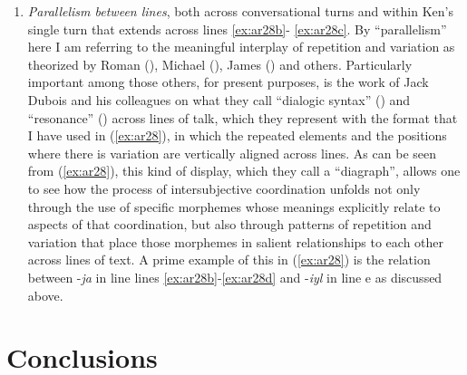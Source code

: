 \documentclass[output=paper]{langsci/langscibook}
\begin{document}
\begin{enumerate}
	\item \emph{Parallelism between lines}, both across conversational turns and within Ken’s single turn that extends across lines  \ref{ex:ar28b}- \ref{ex:ar28c}. By “parallelism” here I am referring to the meaningful interplay of repetition and variation as theorized by Roman \citeauthor{Jakobson1960} (\citeyear{Jakobson1960}), Michael \citeauthor{Silverstein2004} (\citeyear{Silverstein2004}), James \citeauthor{Fox2014} (\citeyear{Fox2014}) and others. Particularly important among those others, for present purposes, is the work of Jack Dubois and his colleagues on what they call “dialogic syntax” (\citealt{Dubois2014}) and “resonance” (\citealt{DuboisGloria2014}) across lines of talk, which they represent with the format that I have used in (\ref{ex:ar28}), in which the repeated elements and the positions where there is variation are vertically aligned across lines. As can be seen from (\ref{ex:ar28}), this kind of display, which they call a “diagraph”, allows one to see how the process of intersubjective coordination unfolds not only through the use of specific morphemes whose meanings explicitly relate to aspects of that coordination, but also through patterns of repetition and variation that place those morphemes in salient relationships to each other across lines of text. A prime example of this in (\ref{ex:ar28}) is the relation between -\textit{ja} in line lines \ref{ex:ar28b}-\ref{ex:ar28d} and -\textit{iyl} in line e as discussed above.
\end{enumerate}


\section{Conclusions}\label{s:ar8}
\end{document}
